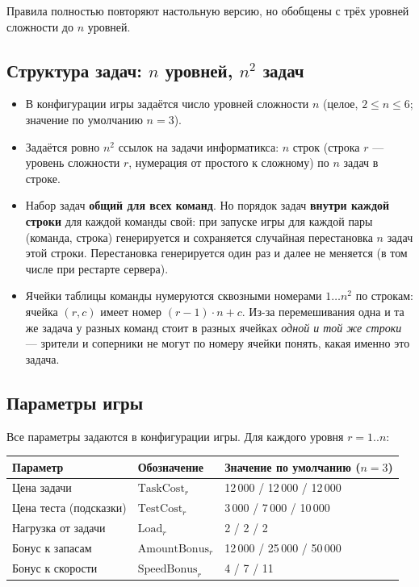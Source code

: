 \documentclass[12pt,a4paper]{article}
\begin{document}
Правила полностью повторяют настольную версию, но обобщены с трёх уровней
сложности до $n$ уровней.

\subsection{Структура задач: $n$ уровней, $n^2$ задач}

\begin{itemize}[nosep]
  \item В конфигурации игры задаётся число уровней сложности $n$
        (целое, $2 \le n \le 6$; значение по умолчанию $n=3$).
  \item Задаётся ровно $n^2$ ссылок на задачи информатикса: $n$ строк
        (строка $r$ --- уровень сложности $r$, нумерация от простого к
        сложному) по $n$ задач в строке.
  \item Набор задач \textbf{общий для всех команд}. Но порядок задач
        \textbf{внутри каждой строки} для каждой команды свой: при запуске
        игры для каждой пары (команда, строка) генерируется и сохраняется
        случайная перестановка $n$ задач этой строки. Перестановка
        генерируется один раз и далее не меняется (в том числе при
        рестарте сервера).
  \item Ячейки таблицы команды нумеруются сквозными номерами
        $1 \dots n^2$ по строкам: ячейка $(r, c)$ имеет номер $(r-1)\cdot n + c$.
        Из-за перемешивания одна и та же задача у разных команд стоит в
        разных ячейках \emph{одной и той же строки} --- зрители и соперники
        не могут по номеру ячейки понять, какая именно это задача.
\end{itemize}

\subsection{Параметры игры}

Все параметры задаются в конфигурации игры. Для каждого уровня $r = 1..n$:

\begin{longtable}{@{}p{5.2cm}p{3.2cm}p{6.8cm}@{}}
\toprule
\textbf{Параметр} & \textbf{Обозначение} & \textbf{Значение по умолчанию ($n=3$)} \\
\midrule
Цена задачи & $\mathrm{TaskCost}_r$ & 12\,000 / 12\,000 / 12\,000 \\
Цена теста (подсказки) & $\mathrm{TestCost}_r$ & 3\,000 / 7\,000 / 10\,000 \\
Нагрузка от задачи & $\mathrm{Load}_r$ & 2 / 2 / 2 \\
Бонус к запасам & $\mathrm{AmountBonus}_r$ & 12\,000 / 25\,000 / 50\,000 \\
Бонус к скорости & $\mathrm{SpeedBonus}_r$ & 4 / 7 / 11 \\
\bottomrule
\end{longtable}
\end{document}
